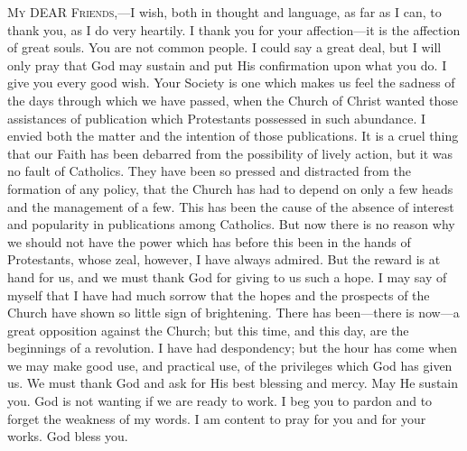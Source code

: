 M\textsc{y}
DEAR F\textsc{riends},—I wish,
both in thought and language, as far as I can, to thank you, as I do
very heartily. I thank you for your affection—it is the affection of
great souls. You are not common people. I could say a great deal, but
I will only pray that God may sustain and put His confirmation upon
what you do. I give you every good wish. Your Society is one which
makes us feel the sadness of the days through which we have passed,
when the Church of Christ wanted those assistances of publication
which Protestants possessed in such abundance. I envied both the
matter and the intention of those publications. It is a cruel thing
that our Faith has been debarred from the possibility of lively
action, but it was no fault of Catholics. They have been so pressed
and distracted from the formation of any policy, that the Church has
had to depend on only a few heads and the management of a few. This
has been the cause of the absence of interest and popularity in
publications among Catholics. But now there is no reason why we should
not have the power which has before this been in the hands of
Protestants, whose zeal, however, I have always admired. But the
reward is at hand for us, and we must thank God for giving to us such
a hope. I may say of myself that I have had much sorrow that the hopes
and the prospects of the Church have shown so little sign of
brightening. There has been—there is now—a great opposition
against the Church; but this time, and this day, are the beginnings of
a revolution. I have had despondency; but the hour has come when we
may make good use, and practical use, of the privileges which God has
given us. We must thank God and ask for His best blessing and mercy.
May He sustain you. God is not wanting if we are ready to work. I beg
you to pardon and to forget the weakness of my words. I am content to
pray for you and for your works. God bless you.
